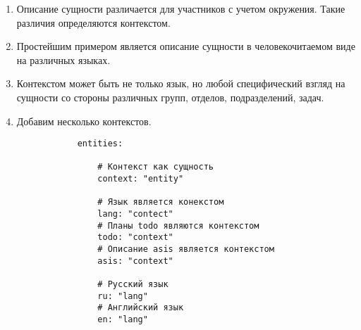\documentclass[final]{article}
\begin{document}
        \begin{enumerate} 

            \item Описание сущности различается для участников с 
            учетом окружения. Такие различия определяются контекстом.

            \item Простейшим примером является описание сущности в 
            человекочитаемом виде на различных языках.

            \item Контекстом может быть не только язык, но любой специфический 
            взгляд на сущности со стороны различных групп, отделов, 
            подразделений, задач.

            \item Добавим несколько контекстов.

            \begin{verbatim}
            entities:

                # Контекст как сущность
                context: "entity"

                # Язык является конекстом
                lang: "contect"
                # Планы todo являются контекстом
                todo: "context"
                # Описание asis является контекстом
                asis: "context"

                # Русский язык
                ru: "lang"
                # Английский язык
                en: "lang"

            \end{verbatim}

        \end{enumerate}
\end{document}
